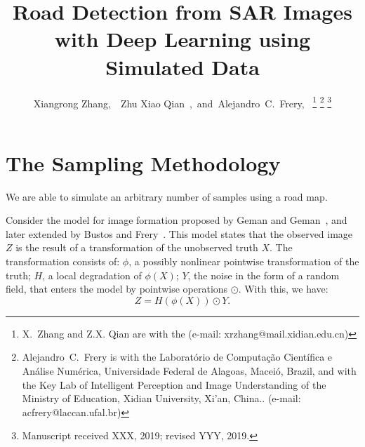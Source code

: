 \documentclass[journal]{IEEEtran}
\begin{document}
	
\title{Road Detection from SAR Images with Deep Learning using Simulated Data}
	
\author{Xiangrong Zhang,~~Zhu Xiao Qian~,~and~Alejandro~C.~Frery,~%
	\thanks{X.~Zhang and Z.X. Qian are with the  (e-mail: xrzhang@mail.xidian.edu.cn)}%
	\thanks{Alejandro~C.~Frery is with the Laborat\'orio de Computa\c c\~ao Cient\'ifica e An\'alise Num\'erica, Universidade Federal de Alagoas, Macei\'o, Brazil, and with the Key Lab of Intelligent Perception and Image Understanding of the Ministry of Education, Xidian University, Xi'an, China.. (e-mail: acfrery@laccan.ufal.br)}%
	\thanks{Manuscript received XXX, 2019; revised YYY, 2019.}
	}


\maketitle

\IEEEdisplaynontitleabstractindextext
\IEEEpeerreviewmaketitle

\section{The Sampling Methodology}\label{sec:SamplingMethodology}

We are able to simulate an arbitrary number of samples using a road map.

Consider the model for image formation proposed by Geman and Geman~\cite{geman84}, and later extended by Bustos and Frery~\cite{buseucam92}.
This model states that the observed image $Z$ is the result of a transformation of the unobserved truth $X$.
The transformation consists of:
$\phi$, a possibly nonlinear pointwise transformation of the truth;
$H$, a local degradation of $\phi(X)$;
$Y$, the noise in the form of a random field, that enters the model by pointwise operations $\odot$.
With this, we have:
\begin{equation}
Z = H(\phi(X)) \odot Y.
\label{eq:GemanGeman}
\end{equation}
\end{document}
